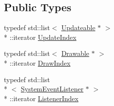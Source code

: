 \subsection*{Public Types}
\begin{DoxyCompactItemize}
\item 
typedef std\+::list$<$ \hyperlink{classZeta_1_1Updateable}{Updateable} $\ast$ $>$\\*
\+::iterator \hyperlink{classZeta_1_1GeneralLoop_ae1284d366ca644323f019a9e3fcb1b0e}{Update\+Index}
\item 
typedef std\+::list$<$ \hyperlink{classZeta_1_1Drawable}{Drawable} $\ast$ $>$\\*
\+::iterator \hyperlink{classZeta_1_1GeneralLoop_a2da478213f010a795485306725782cf4}{Draw\+Index}
\item 
typedef std\+::list\\*
$<$ \hyperlink{classZeta_1_1SystemEventListener}{System\+Event\+Listener} $\ast$ $>$\\*
\+::iterator \hyperlink{classZeta_1_1GeneralLoop_a1e3fa8c44577a032a92aca0828310d30}{Listener\+Index}
\end{DoxyCompactItemize}
